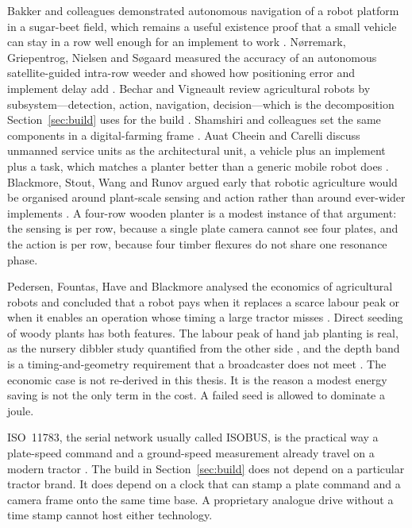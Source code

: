Bakker and colleagues demonstrated autonomous navigation of a robot platform in a sugar-beet field, which remains a useful existence proof that a small vehicle can stay in a row well enough for an implement to work \cite{bakker2011}. N{\o}rremark, Griepentrog, Nielsen and S{\o}gaard measured the accuracy of an autonomous satellite-guided intra-row weeder and showed how positioning error and implement delay add \cite{norremark2008}. Bechar and Vigneault review agricultural robots by subsystem---detection, action, navigation, decision---which is the decomposition Section~\ref{sec:build} uses for the build \cite{bechar2016}. Shamshiri and colleagues set the same components in a digital-farming frame \cite{shamshiri2018}. Auat Cheein and Carelli discuss unmanned service units as the architectural unit, a vehicle plus an implement plus a task, which matches a planter better than a generic mobile robot does \cite{auat2013}. Blackmore, Stout, Wang and Runov argued early that robotic agriculture would be organised around plant-scale sensing and action rather than around ever-wider implements \cite{blackmore2005}. A four-row wooden planter is a modest instance of that argument: the sensing is per row, because a single plate camera cannot see four plates, and the action is per row, because four timber flexures do not share one resonance phase.

Pedersen, Fountas, Have and Blackmore analysed the economics of agricultural robots and concluded that a robot pays when it replaces a scarce labour peak or when it enables an operation whose timing a large tractor misses \cite{pedersen2006}. Direct seeding of woody plants has both features. The labour peak of hand jab planting is real, as the nursery dibbler study quantified from the other side \cite{dibbler}, and the depth band is a timing-and-geometry requirement that a broadcaster does not meet \cite{masarei2019}. The economic case is not re-derived in this thesis. It is the reason a modest energy saving is not the only term in the cost. A failed seed is allowed to dominate a joule.

ISO~11783, the serial network usually called ISOBUS, is the practical way a plate-speed command and a ground-speed measurement already travel on a modern tractor \cite{iso11783}. The build in Section~\ref{sec:build} does not depend on a particular tractor brand. It does depend on a clock that can stamp a plate command and a camera frame onto the same time base. A proprietary analogue drive without a time stamp cannot host either technology.


